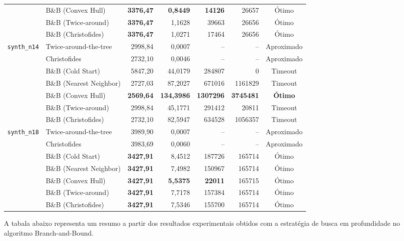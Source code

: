 \documentclass[12pt]{article}
\begin{document}
\begin{table}[H]
{\begin{tabular}{llrrrrc}
  & B\&B (Convex Hull) & \textbf{3376,47} & \textbf{0,8449} & \textbf{14126} & 26657 & Ótimo \\
  & B\&B (Twice-around) & \textbf{3376,47} & 1,1628 & 39663 & 26656 & Ótimo \\
  & B\&B (Christofides) & \textbf{3376,47} & 1,0271 & 17464 & 26656 & Ótimo \\
\midrule
\multirow{7}{*}{\texttt{synth\_n14}} 
  & Twice-around-the-tree & 2998,84 & 0,0007 & -- & -- & Aproximado \\
  & Christofides & 2732,10 & 0,0046 & -- & -- & Aproximado \\
  & B\&B (Cold Start) & 5847,20 & 44,0179 & 284807 & 0 & Timeout \\
  & B\&B (Nearest Neighbor) & 2727,03 & 87,2027 & 671016 & 1161829 & Timeout \\
  & B\&B (Convex Hull) & \textbf{2569,64} & \textbf{134,3986} & \textbf{1307296} & \textbf{3745481} & \textbf{Ótimo} \\
  & B\&B (Twice-around) & 2998,84 & 45,1771 & 291412 & 20811 & Timeout \\
  & B\&B (Christofides) & 2732,10 & 82,5947 & 634528 & 1056357 & Timeout \\
  \midrule
\multirow{7}{*}{\texttt{synth\_n18}} 
  & Twice-around-the-tree & 3989,90 & 0,0007 & -- & -- & Aproximado \\
  & Christofides & 3983,69 & 0,0060 & -- & -- & Aproximado \\
  & B\&B (Cold Start) & \textbf{3427,91} & 8,4512 & 187726 & 165714 & Ótimo \\
  & B\&B (Nearest Neighbor) & \textbf{3427,91} & 7,4982 & 150967 & 165714 & Ótimo \\
  & B\&B (Convex Hull) & \textbf{3427,91} & \textbf{5,5375} & \textbf{22011} & 165715 & Ótimo \\
  & B\&B (Twice-around) & \textbf{3427,91} & 7,7178 & 157384 & 165714 & Ótimo \\
  & B\&B (Christofides) & \textbf{3427,91} & 7,5346 & 155700 & 165714 & Ótimo \\
\bottomrule
\end{tabular}%
}
\end{table}

A tabala abaixo representa um resumo a partir dos resultados experimentais obtidos com a estratégia de busca em profundidade  no algoritmo Branch-and-Bound. 
\end{document}
